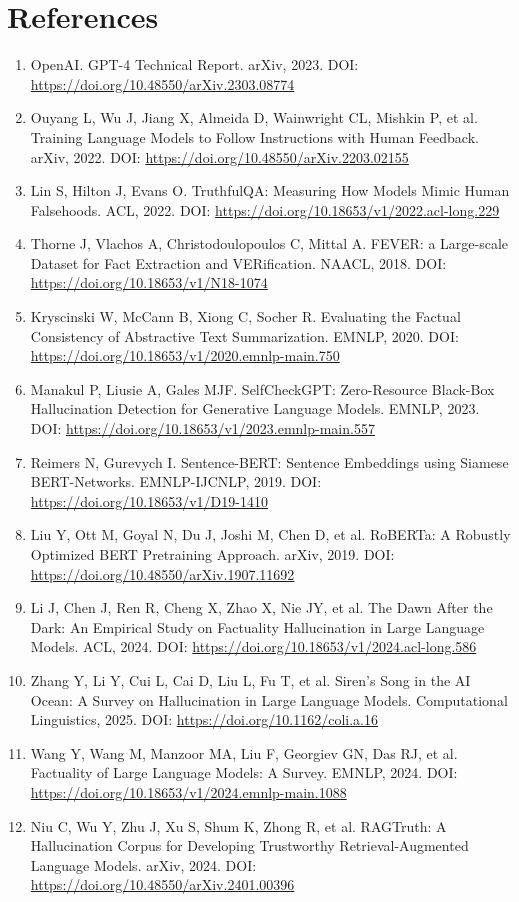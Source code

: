 \documentclass[11pt]{article}
\begin{document}
\section*{References}
\small
\begin{enumerate}[leftmargin=1.5em]
\item OpenAI. GPT-4 Technical Report. arXiv, 2023. DOI: \url{https://doi.org/10.48550/arXiv.2303.08774}
\item Ouyang L, Wu J, Jiang X, Almeida D, Wainwright CL, Mishkin P, et al. Training Language Models to Follow Instructions with Human Feedback. arXiv, 2022. DOI: \url{https://doi.org/10.48550/arXiv.2203.02155}
\item Lin S, Hilton J, Evans O. TruthfulQA: Measuring How Models Mimic Human Falsehoods. ACL, 2022. DOI: \url{https://doi.org/10.18653/v1/2022.acl-long.229}
\item Thorne J, Vlachos A, Christodoulopoulos C, Mittal A. FEVER: a Large-scale Dataset for Fact Extraction and VERification. NAACL, 2018. DOI: \url{https://doi.org/10.18653/v1/N18-1074}
\item Kryscinski W, McCann B, Xiong C, Socher R. Evaluating the Factual Consistency of Abstractive Text Summarization. EMNLP, 2020. DOI: \url{https://doi.org/10.18653/v1/2020.emnlp-main.750}
\item Manakul P, Liusie A, Gales MJF. SelfCheckGPT: Zero-Resource Black-Box Hallucination Detection for Generative Language Models. EMNLP, 2023. DOI: \url{https://doi.org/10.18653/v1/2023.emnlp-main.557}
\item Reimers N, Gurevych I. Sentence-BERT: Sentence Embeddings using Siamese BERT-Networks. EMNLP-IJCNLP, 2019. DOI: \url{https://doi.org/10.18653/v1/D19-1410}
\item Liu Y, Ott M, Goyal N, Du J, Joshi M, Chen D, et al. RoBERTa: A Robustly Optimized BERT Pretraining Approach. arXiv, 2019. DOI: \url{https://doi.org/10.48550/arXiv.1907.11692}
\item Li J, Chen J, Ren R, Cheng X, Zhao X, Nie JY, et al. The Dawn After the Dark: An Empirical Study on Factuality Hallucination in Large Language Models. ACL, 2024. DOI: \url{https://doi.org/10.18653/v1/2024.acl-long.586}
\item Zhang Y, Li Y, Cui L, Cai D, Liu L, Fu T, et al. Siren's Song in the AI Ocean: A Survey on Hallucination in Large Language Models. Computational Linguistics, 2025. DOI: \url{https://doi.org/10.1162/coli.a.16}
\item Wang Y, Wang M, Manzoor MA, Liu F, Georgiev GN, Das RJ, et al. Factuality of Large Language Models: A Survey. EMNLP, 2024. DOI: \url{https://doi.org/10.18653/v1/2024.emnlp-main.1088}
\item Niu C, Wu Y, Zhu J, Xu S, Shum K, Zhong R, et al. RAGTruth: A Hallucination Corpus for Developing Trustworthy Retrieval-Augmented Language Models. arXiv, 2024. DOI: \url{https://doi.org/10.48550/arXiv.2401.00396}
\end{enumerate}
\end{document}
